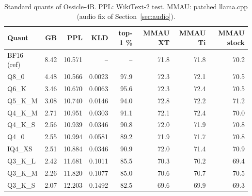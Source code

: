 \documentclass[10pt,a4paper]{article}
\begin{document}
\begin{table}[H]
\centering\small
\caption{Standard quants of Ossicle-4B. PPL: WikiText-2 test. MMAU: patched llama.cpp (audio fix of Section~\ref{sec:audio}).}
\label{tab:quants}
\begin{tabular}{@{}lrrrrrrr@{}}
\toprule
Quant & GB & PPL & KLD & top-1 \% & MMAU XT & MMAU Ti & MMAU stock\\
\midrule
BF16 (ref) & 8.42 & 10.571 & -- & -- & 71.8 & 71.8 & 70.2\\
Q8\_0 & 4.48 & 10.566 & 0.0023 & 97.9 & 72.3 & 72.1 & 70.5\\
Q6\_K & 3.46 & 10.670 & 0.0063 & 95.6 & 72.3 & 72.4 & 70.5\\
Q5\_K\_M & 3.08 & 10.740 & 0.0146 & 94.0 & 72.8 & 72.2 & 71.2\\
Q4\_K\_M & 2.71 & 10.951 & 0.0303 & 91.1 & 72.1 & 72.4 & 70.0\\
Q4\_K\_S & 2.56 & 10.939 & 0.0346 & 90.8 & 72.0 & 71.9 & 70.8\\
Q4\_0 & 2.55 & 10.994 & 0.0581 & 89.2 & 71.9 & 71.7 & 70.8\\
IQ4\_XS & 2.51 & 10.884 & 0.0346 & 90.9 & 72.0 & 71.4 & 70.9\\
Q3\_K\_L & 2.42 & 11.681 & 0.1011 & 85.5 & 70.3 & 70.2 & 69.4\\
Q3\_K\_M & 2.26 & 11.820 & 0.1077 & 85.0 & 70.6 & 70.7 & 70.5\\
Q3\_K\_S & 2.07 & 12.203 & 0.1492 & 82.5 & 69.6 & 69.9 & 69.3\\
\bottomrule
\end{tabular}
\end{table}
\end{document}
